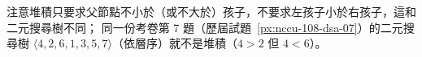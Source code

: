 \begin{pastsoln}
注意堆積只要求父節點不小於（或不大於）孩子，不要求左孩子小於右孩子，這和二元搜尋樹不同；
同一份考卷第 7 題（歷屆試題~\ref{px:nccu-108-dsa-07}）的二元搜尋樹 $\langle 4, 2, 6, 1, 3, 5, 7 \rangle$（依層序）就不是堆積（$4 > 2$ 但 $4 < 6$）。
\end{pastsoln}
